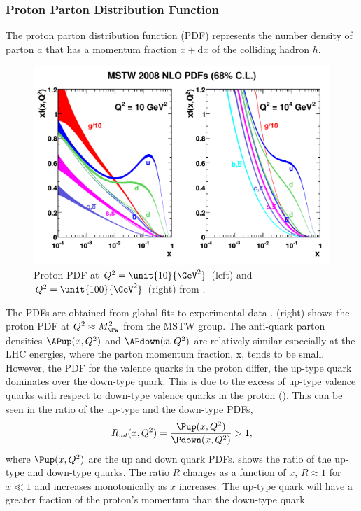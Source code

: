 \subsubsection*{Proton Parton Distribution Function} 
The proton parton distribution function (PDF) represents the number density of
parton $a$ that has a momentum fraction $x+\mathrm{d}x$ of the colliding hadron
$h$.  

\begin{figure}[htbp]
  \centering
  \includegraphics[width=\textwidth]{mstw2008nlo68cl_allpdfs}
  \caption[Proton PDF at  $ Q^2 = \unit{ 10  }{\GeV^2} $ and $ Q^2 = \unit{ 100
}{\GeV^2} $.] {Proton PDF at  $ Q^2 = \unit{ 10  }{\GeV^2} $ (left) and $ Q^2 =
\unit{ 100  }{\GeV^2} $ (right) from \cite{martin2009parton}.}
  \label{wbos:pdf}
\end{figure}

The {PDFs} are obtained from global fits to experimental data
\cite{martin2009parton}.   (right) shows the proton PDF at
$Q^2\approx M_{\PW}^2$ from the MSTW group.  The anti-quark parton densities
$\APup(x,Q^2)$ and $\APdown(x,Q^2)$ are relatively similar especially at the LHC
energies, where the parton momentum fraction, x, tends to be small.
However, the {PDF} for the valence quarks in the proton differ, 
the up-type quark dominates over the down-type quark.
This is due to the excess of up-type valence quarks with respect to down-type
valence quarks in the proton (\HepProcess{\Pup\Pup\Pdown}). 
This can be seen in the ratio of the up-type and the down-type {PDFs},
\begin{equation}
  R_{ud}(x,Q^2) = \frac{\Pup(x,Q^2)}{ \Pdown(x,Q^2)} > 1,
\end{equation}
where $\Pup(x,Q^2)$ are the up and down quark {PDFs}.
 shows the ratio of the up-type and down-type
quarks.  The ratio $R$ changes as a function of $x$, $R \approx 1$ for $x \ll 1$
and increases monotonically as $x$ increases.  The up-type quark will have a
greater fraction of the proton's momentum than the down-type quark.


